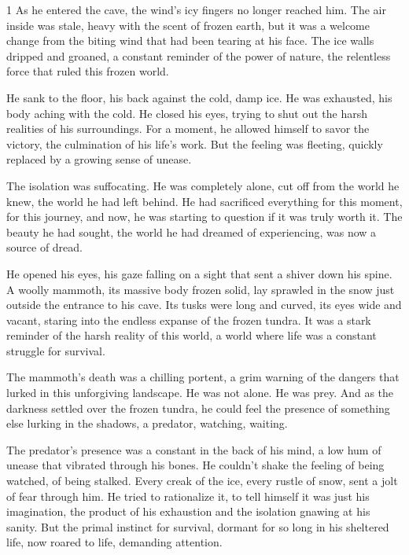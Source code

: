\documentclass{article}
\newcommand{\Agentsroomzs}{\textsc{Agents' Room$_{ZS}$}}
\begin{document}
\begin{tcolorbox}[colback=white, colframe=gray!30!white, coltitle=black, parskip=5mm, title=
    \textbf{System output: \Agentsroomzs}, breakable]
\begin{spacing}{1}
As he entered the cave, the wind's icy fingers no longer reached him. The air inside was stale, heavy with the scent of frozen earth, but it was a welcome change from the biting wind that had been tearing at his face. The ice walls dripped and groaned, a constant reminder of the power of nature, the relentless force that ruled this frozen world.\\\par

He sank to the floor, his back against the cold, damp ice. He was exhausted, his body aching with the cold.  He closed his eyes, trying to shut out the harsh realities of his surroundings.  For a moment, he allowed himself to savor the victory, the culmination of his life's work. But the feeling was fleeting, quickly replaced by a growing sense of unease.\\\par

The isolation was suffocating. He was completely alone, cut off from the world he knew, the world he had left behind.  He had sacrificed everything for this moment, for this journey, and now, he was starting to question if it was truly worth it. The beauty he had sought, the world he had dreamed of experiencing, was now a source of dread.\\\par

He opened his eyes, his gaze falling on a sight that sent a shiver down his spine.  A woolly mammoth, its massive body frozen solid, lay sprawled in the snow just outside the entrance to his cave.  Its tusks were long and curved, its eyes wide and vacant, staring into the endless expanse of the frozen tundra. It was a stark reminder of the harsh reality of this world, a world where life was a constant struggle for survival.
\\\par

The mammoth's death was a chilling portent, a grim warning of the dangers that lurked in this unforgiving landscape.  He was not alone. He was prey.  And as the darkness settled over the frozen tundra, he could feel the presence of something else lurking in the shadows, a predator, watching, waiting.\\\par

The predator's presence was a constant in the back of his mind, a low hum of unease that vibrated through his bones. He couldn't shake the feeling of being watched, of being stalked. Every creak of the ice, every rustle of snow, sent a jolt of fear through him.  He tried to rationalize it, to tell himself it was just his imagination, the product of his exhaustion and the isolation gnawing at his sanity. But the primal instinct for survival, dormant for so long in his sheltered life, now roared to life, demanding attention.\\\par


\end{spacing}
\end{tcolorbox}
\end{document}
